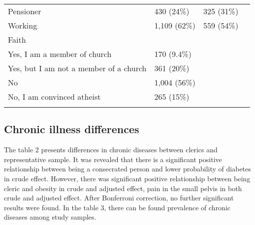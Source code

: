 \documentclass[ijerph,article,accept,moreauthors,pdftex]{mdpi}
\begin{document}
\begin{table}
{\begin{tabular}[t]{llll}
\hspace{1em}Pensioner & 430 (24\%) & 325 (31\%) & \\
\hspace{1em}Working & 1,109 (62\%) & 559 (54\%) & \\
Faith &  &  & \\
\hspace{1em}Yes, I am a member of church & 170 (9.4\%) &  & \\
\addlinespace
\hspace{1em}Yes, but I am not a member of a church & 361 (20\%) &  & \\
\hspace{1em}No & 1,004 (56\%) &  & \\
\hspace{1em}No, I am convinced atheist & 265 (15\%) &  & \\
\bottomrule{}
\end{tabular}}
\end{table}

\newpage

\hypertarget{chronic-illness-differences}{%
\subsection{Chronic illness
differences}\label{chronic-illness-differences}}

The table 2 presents differences in chronic diseases between clerics and
representative sample. It was revealed that there is a significant
positive relationship between being a consecrated person and lower
probability of diabetes in crude effect. However, there was significant
positive relationship between being cleric and obesity in crude and
adjusted effect, pain in the small pelvis in both crude and adjusted
effect. After Bonferroni correction, no further significant results were
found. In the table 3, there can be found prevalence of chronic diseases
among study samples.
\end{document}
